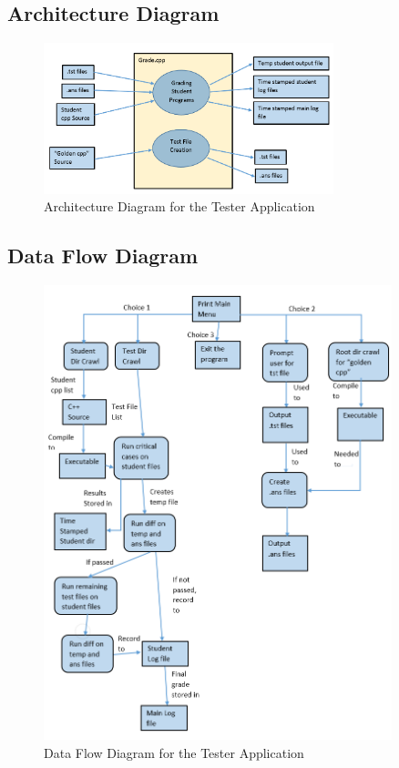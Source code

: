\subsection{Architecture  Diagram}
\begin{figure}[H]
\begin{center}
\includegraphics[width=0.75\textwidth]{./Arch_generic}
\end{center}
\caption{Architecture Diagram for the Tester Application \label{arch_generic}}
\end{figure}


\subsection{Data Flow Diagram} 

\begin{figure}[H]
\begin{center}
\includegraphics[width=0.9\textwidth]{./Dataflow}
\end{center}
\caption{ Data Flow Diagram for the Tester Application \label{dataflow}}
\end{figure}


